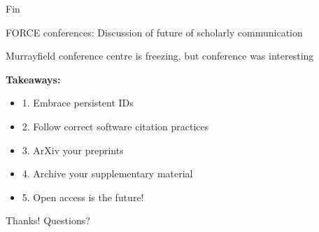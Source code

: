 \documentclass[11.5pt, aspectratio=169]{beamer}
\begin{document}
\begin{frame}{Fin}
  \begin{fullpageitemize}
    \item FORCE conferences: Discussion of future of scholarly communication
    \item Murrayfield conference centre is freezing, but conference was interesting
    \item {\large \textbf{Takeaways:}}
      \begin{itemize}
        \item 1. Embrace persistent IDs
        \item 2. Follow correct software citation practices
        \item 3. ArXiv your preprints
        \item 4. Archive your supplementary material
        \item 5. Open access is the future!
      \end{itemize}
  \end{fullpageitemize}

  \begin{center}
    Thanks! Questions?
  \end{center}
\end{frame}
\end{document}
